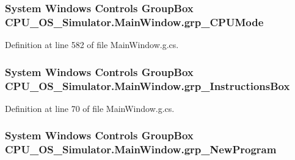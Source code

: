 \subsubsection[{grp\+\_\+\+C\+P\+U\+Mode}]{\setlength{\rightskip}{0pt plus 5cm}System Windows Controls Group\+Box C\+P\+U\+\_\+\+O\+S\+\_\+\+Simulator.\+Main\+Window.\+grp\+\_\+\+C\+P\+U\+Mode\hspace{0.3cm}{\ttfamily [package]}}\label{class_c_p_u___o_s___simulator_1_1_main_window_a0e549bad0f6778b2ea3fffb6c2d1a2bb}


Definition at line 582 of file Main\+Window.\+g.\+cs.

\hypertarget{class_c_p_u___o_s___simulator_1_1_main_window_aebc1256b654d001b7c4ce2bc08522667}{}
\subsubsection[{grp\+\_\+\+Instructions\+Box}]{\setlength{\rightskip}{0pt plus 5cm}System Windows Controls Group\+Box C\+P\+U\+\_\+\+O\+S\+\_\+\+Simulator.\+Main\+Window.\+grp\+\_\+\+Instructions\+Box\hspace{0.3cm}{\ttfamily [package]}}\label{class_c_p_u___o_s___simulator_1_1_main_window_aebc1256b654d001b7c4ce2bc08522667}


Definition at line 70 of file Main\+Window.\+g.\+cs.

\hypertarget{class_c_p_u___o_s___simulator_1_1_main_window_a1e75e7af485b229372a6aafb84c2ffe0}{}
\subsubsection[{grp\+\_\+\+New\+Program}]{\setlength{\rightskip}{0pt plus 5cm}System Windows Controls Group\+Box C\+P\+U\+\_\+\+O\+S\+\_\+\+Simulator.\+Main\+Window.\+grp\+\_\+\+New\+Program\hspace{0.3cm}{\ttfamily [package]}}\label{class_c_p_u___o_s___simulator_1_1_main_window_a1e75e7af485b229372a6aafb84c2ffe0}


